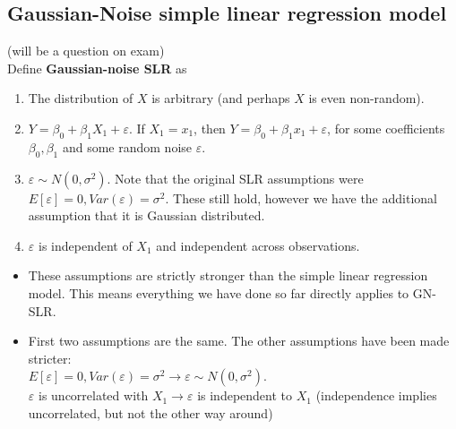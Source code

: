\documentclass[12 pt]{article}
\begin{document}
    \subsection{Gaussian-Noise simple linear regression model}
    (will be a question on exam)
    \\ Define \textbf{Gaussian-noise SLR} as
    \begin{enumerate}
    \item The distribution of $X$ is arbitrary (and perhaps $X$ is
      even non-random).
    \item $Y = \beta_0 + \beta_1 X_1 + \varepsilon$. If $X_1 = x_1$,
      then $Y = \beta_0 + \beta_1 x_1 + \varepsilon$, for some
      coefficients $\beta_0, \beta_1$ and some random noise
      $\varepsilon$.
    \item $\varepsilon \sim N(0, \sigma^2)$. Note that the original
      SLR assumptions were $E[\varepsilon] =0, Var(\varepsilon) =
      \sigma^2$. These still hold, however we have the additional
      assumption that it is Gaussian distributed.
    \item $\varepsilon$ is independent of $X_1$ and independent across observations.
    \end{enumerate}
    \begin{itemize}
    \item These assumptions are strictly stronger than the simple linear
      regression model. This means everything we have done so far
      directly applies to GN-SLR.
    \item First two assumptions are the same. The other assumptions
      have been made stricter:
      \\ $E[\varepsilon] = 0, Var(\varepsilon) = \sigma^2 \to
      \varepsilon \sim N(0, \sigma^2)$.
      \\ $\varepsilon$ is uncorrelated with $X_1 \to \varepsilon$ is
      independent to $X_1$ (independence implies uncorrelated, but not
      the other way around)
    \end{itemize}
\end{document}
